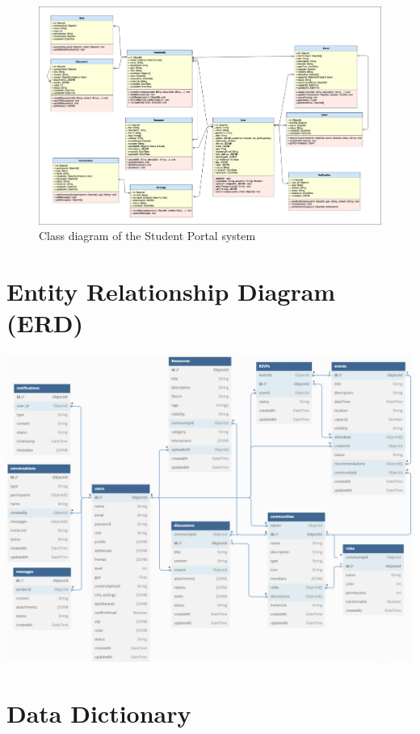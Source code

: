 \begin{figure}[H]
    \centering
    \includegraphics[width=\textwidth]{latex-doc/images/uml.png} 
    \caption{Class diagram of the Student Portal system}
    \label{fig:class_diagram}
\end{figure}

\section{Entity Relationship Diagram (ERD)}
\begin{adjustbox}{width=\textwidth, height=0.35\textheight, keepaspectratio, center}
    \includegraphics{latex-doc/images/schema_diagram.png}
\end{adjustbox}



\section{Data Dictionary}

